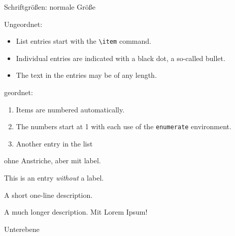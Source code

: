 \documentclass[a4paper, 12pt]{article}
\begin{document}
Schriftgrößen:
\normalsize{normale Größe}
\tiny{}
\small{}
\large{}
\Large{}
\huge{}
\Huge{}






Ungeordnet:
\begin{itemize}
  \item List entries start with the \verb|\item| command.
  \item Individual entries are indicated with a black dot, a so-called bullet.
  \item The text in the entries may be of any length.
\end{itemize}

geordnet:
\begin{enumerate}
  \item Items are numbered automatically.
  \item The numbers start at 1 with each use of the \texttt{enumerate} environment.
  \item Another entry in the list
\end{enumerate}

ohne Anstriche, aber mit label.
\begin{description}
   \item This is an entry \textit{without} a label.
   \item[Something short] A short one-line description.
   \item[Something long] A much longer description. Mit Lorem Ipsum! \blindtext[1]
        \item Unterebene 
\end{description}

\end{document}
